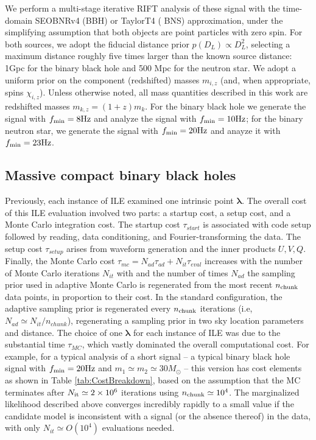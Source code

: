 \documentclass[twocolumn,prd,nofootinbib]{revtex4}
\newcommand\unit[1]{{\rm #1}}
\begin{document}
 We perform a multi-stage iterative RIFT analysis of these signal with the
time-domain SEOBNRv4 (BBH) or TaylorT4 \cite{gw-astro-PN-Comparison-AlessandraSathya2009}( BNS) approximation, under the simplifying assumption that both objects are point particles with zero
spin.   For both sources, we adopt the fiducial distance prior $p(D_L) \propto D_L^2$,   selecting  a maximum distance
roughly five times larger than the known source distance: 1Gpc for the binary black hole and 500 Mpc for the neutron
star.  We adopt a uniform prior on the component (redshifted) masses $m_{i,z}$ (and, when appropriate, spins
$\chi_{i,z}$).
Unless otherwise noted, all mass quantities described in this work are redshifted masses $m_{k,z}=(1+z)m_k$.
For the binary black hole we generate the signal with $f_{\rm min}=8 \unit{Hz}$ and analyze the signal with  $f_{\rm
  min}=10 \unit{Hz}$; for the binary neutron star, we generate the signal with $f_{\rm min}=20\unit{Hz}$ and anayze it
with $f_{\rm min}=23\unit{Hz}$.

\subsection{Massive compact binary black holes}
Previously, each instance of ILE examined one intrinsic point $\bm{\lambda}$.  The overall cost of this ILE evaluation
involved two parts: a startup cost, a setup cost, and a Monte Carlo integration cost.  The  startup cost $\tau_{start}$
is associated with code setup followed by reading, data conditioning, and Fourier-transforming the
data.  The setup cost $\tau_{setup}$ arises from waveform generation and  the inner products $U,V,Q$.  Finally, the Monte Carlo
cost $\tau_{mc}=N_{ad} \tau_{ad}+N_{it}\tau_{eval}$ increases with the number of Monte Carlo iterations $N_{it}$ with
and the number of times $N_{ad}$ the sampling prior used in adaptive Monte Carlo is regenerated from the most recent 
$n_{\rm chunk}$ data points, in proportion to their
cost.   In the standard configuration, the adaptive sampling prior is regenerated every $n_{\rm chunk}$ iterations (i.e,
 $N_{ad} \simeq N_{it}/n_{chunk}$), regenerating a sampling prior in two sky location parameters and distance.  
The choice of one $\bm{\lambda}$ for each instance of ILE was due to the substantial time  $\tau_{MC}$, which vastly
dominated the overall computational cost.   For example, for a typical analysis of a short signal --  a typical binary
black hole signal with $f_{\rm min}=20 \unit{Hz}$ and $m_1\simeq m_2\simeq 30 M_\odot$ --  this version has
cost elements as shown in Table \ref{tab:CostBreakdown}, based on the assumption that the MC terminates after $N_{\rm it}\simeq 2\times 10^6$ iterations using
$n_{\rm chunk}\simeq 10^4$.  
The marginalized likelihood described above  converges incredibly rapidly to a small value if the candidate model is
inconsistent with a signal (or the absence thereof) in the data, with only $N_{it} \simeq O(10^4)$  evaluations needed.
\end{document}
